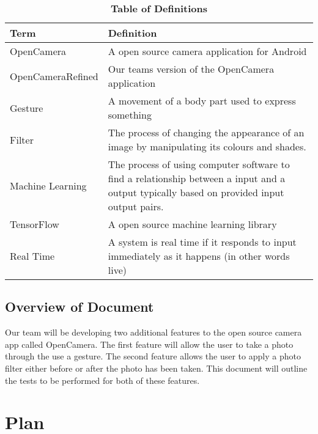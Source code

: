 \documentclass[12pt, titlepage]{article}
\begin{document}
\begin{table}[!htbp]
\caption{\textbf{Table of Definitions}} \label{Table}

\begin{tabularx}{\textwidth}{p{4cm}X}
\toprule
\textbf{Term} & \textbf{Definition}\\
\midrule
OpenCamera & A open source camera application for Android\\
OpenCameraRefined & Our teams version of the OpenCamera application\\
Gesture & A movement of a body part used to express something\\
Filter & The process of changing the appearance of an image by manipulating its colours and shades.\\
Machine Learning & The process of using computer software to find a relationship between a input and a output typically based on provided input output pairs.\\
TensorFlow & A open source machine learning library\\
Real Time & A system is real time if it responds to input immediately as it happens (in other words live)\\
\bottomrule
\end{tabularx}

\end{table}	

\subsection{Overview of Document}
    Our team will be developing two additional features to the open source camera app called OpenCamera.  The first feature will allow the user to take a photo through the use a gesture. The second feature allows the user to apply a photo filter either before or after the photo has been taken. This document will outline the tests to be performed for both of these features.

\section{Plan}
	
\end{document}
